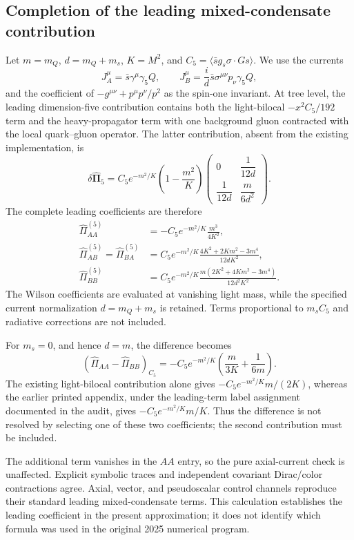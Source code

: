 \subsection*{Completion of the leading mixed-condensate contribution}

Let $m=m_Q$, $d=m_Q+m_s$, $K=M^2$, and
$C_5=\langle\bar s g_s\sigma\!\cdot\!G s\rangle$.
We use the currents
\begin{equation}
J_A^\mu=\bar s\gamma^\mu\gamma_5 Q,
\qquad
J_B^\mu=\frac{i}{d}\bar s\sigma^{\mu\nu}p_\nu\gamma_5 Q,
\end{equation}
and the coefficient of $-g^{\mu\nu}+p^\mu p^\nu/p^2$ as the spin-one
invariant. At tree level, the leading dimension-five contribution contains
both the light-bilocal $-x^2 C_5/192$ term and the heavy-propagator term with
one background gluon contracted with the local quark--gluon operator.
The latter contribution, absent from the existing implementation, is
\begin{equation}
\delta\widehat{\boldsymbol\Pi}_5
=C_5e^{-m^2/K}\left(1-\frac{m^2}{K}\right)
\begin{pmatrix}
0 & \dfrac{1}{12d}\\[4pt]
\dfrac{1}{12d} & \dfrac{m}{6d^2}
\end{pmatrix}.
\end{equation}
The complete leading coefficients are therefore
\begin{align}
\widehat\Pi_{AA}^{(5)}
&=-C_5e^{-m^2/K}\frac{m^3}{4K^2},\\
\widehat\Pi_{AB}^{(5)}=\widehat\Pi_{BA}^{(5)}
&=C_5e^{-m^2/K}\frac{4K^2+2Km^2-3m^4}{12dK^2},\\
\widehat\Pi_{BB}^{(5)}
&=C_5e^{-m^2/K}\frac{m(2K^2+4Km^2-3m^4)}{12d^2K^2}.
\end{align}
The Wilson coefficients are evaluated at vanishing light mass, while the
specified current normalization $d=m_Q+m_s$ is retained. Terms proportional
to $m_s C_5$ and radiative corrections are not included.

For $m_s=0$, and hence $d=m$, the difference becomes
\begin{equation}
\left(\widehat\Pi_{AA}-\widehat\Pi_{BB}\right)_{C_5}
=-C_5e^{-m^2/K}\left(\frac{m}{3K}+\frac{1}{6m}\right).
\end{equation}
The existing light-bilocal contribution alone gives
$-C_5e^{-m^2/K}m/(2K)$, whereas the earlier printed appendix, under the
leading-term label assignment documented in the audit, gives
$-C_5e^{-m^2/K}m/K$. Thus the difference is not resolved by selecting one
of these two coefficients; the second contribution must be included.

The additional term vanishes in the $AA$ entry, so the pure axial-current
check is unaffected. Explicit symbolic traces and independent covariant
Dirac/color contractions agree. Axial, vector, and pseudoscalar control
channels reproduce their standard leading mixed-condensate terms.
This calculation establishes the leading coefficient in the present
approximation; it does not identify which formula was used in the original
2025 numerical program.
